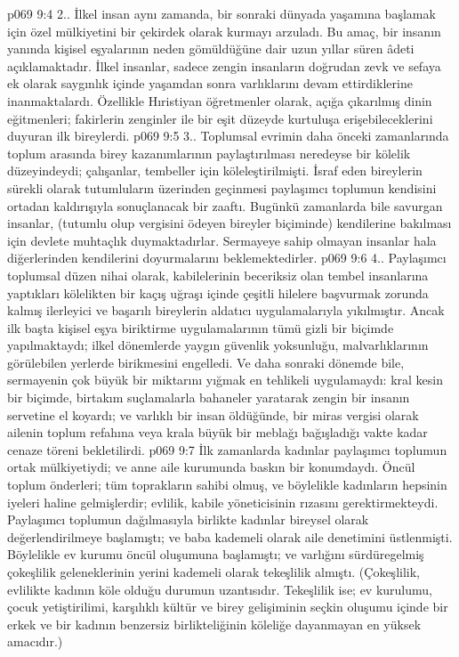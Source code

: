 \vs p069 9:4 2.\bibnobreakspace {}. İlkel insan aynı zamanda, bir sonraki dünyada yaşamına başlamak için özel mülkiyetini bir çekirdek olarak kurmayı arzuladı. Bu amaç, bir insanın yanında kişisel eşyalarının neden gömüldüğüne dair uzun yıllar süren âdeti açıklamaktadır. İlkel insanlar, sadece zengin insanların doğrudan zevk ve sefaya ek olarak saygınlık içinde yaşamdan sonra varlıklarını devam ettirdiklerine inanmaktalardı. Özellikle Hıristiyan öğretmenler olarak, açığa çıkarılmış dinin eğitmenleri; fakirlerin zenginler ile bir eşit düzeyde kurtuluşa erişebileceklerini duyuran ilk bireylerdi.
\vs p069 9:5 3.. Toplumsal evrimin daha önceki zamanlarında toplum arasında birey kazanımlarının paylaştırılması neredeyse bir kölelik düzeyindeydi; çalışanlar, tembeller için köleleştirilmişti. İsraf eden bireylerin sürekli olarak tutumluların üzerinden geçinmesi paylaşımcı toplumun kendisini ortadan kaldırışıyla sonuçlanacak bir zaaftı. Bugünkü zamanlarda bile savurgan insanlar, (tutumlu olup vergisini ödeyen bireyler biçiminde) kendilerine bakılması için devlete muhtaçlık duymaktadırlar. Sermayeye sahip olmayan insanlar hala diğerlerinden kendilerini doyurmalarını beklemektedirler.
\vs p069 9:6 4.\bibnobreakspace {}. Paylaşımcı toplumsal düzen nihai olarak, kabilelerinin beceriksiz olan tembel insanlarına yaptıkları kölelikten bir kaçış uğraşı içinde çeşitli hilelere başvurmak zorunda kalmış ilerleyici ve başarılı bireylerin aldatıcı uygulamalarıyla yıkılmıştır. Ancak ilk başta kişisel eşya biriktirme uygulamalarının tümü gizli bir biçimde yapılmaktaydı; ilkel dönemlerde yaygın güvenlik yoksunluğu, malvarlıklarının görülebilen yerlerde birikmesini engelledi. Ve daha sonraki dönemde bile, sermayenin çok büyük bir miktarını yığmak en tehlikeli uygulamaydı: kral kesin bir biçimde, birtakım suçlamalarla bahaneler yaratarak zengin bir insanın servetine el koyardı; ve varlıklı bir insan öldüğünde, bir miras vergisi olarak ailenin toplum refahına veya krala büyük bir meblağı bağışladığı vakte kadar cenaze töreni bekletilirdi.
\vs p069 9:7 İlk zamanlarda kadınlar paylaşımcı toplumun ortak mülkiyetiydi; ve anne aile kurumunda baskın bir konumdaydı. Öncül toplum önderleri; tüm toprakların sahibi olmuş, ve böylelikle kadınların hepsinin iyeleri haline gelmişlerdir; evlilik, kabile yöneticisinin rızasını gerektirmekteydi. Paylaşımcı toplumun dağılmasıyla birlikte kadınlar bireysel olarak değerlendirilmeye başlamıştı; ve baba kademeli olarak aile denetimini üstlenmişti. Böylelikle ev kurumu öncül oluşumuna başlamıştı; ve varlığını sürdüregelmiş çokeşlilik geleneklerinin yerini kademeli olarak tekeşlilik almıştı. (Çokeşlilik, evlilikte kadının köle olduğu durumun uzantısıdır. Tekeşlilik ise; ev kurulumu, çocuk yetiştirilimi, karşılıklı kültür ve birey gelişiminin seçkin oluşumu içinde bir erkek ve bir kadının benzersiz birlikteliğinin köleliğe dayanmayan en yüksek amacıdır.)
